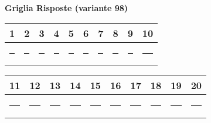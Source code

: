 \documentclass{exam}%
\newcounter{variant}%
\begin{document}
%
\normalsize%
\setcounter{variant}{98}%
\noindent \textbf{  }%
\bigskip%
\noindent\textbf{Griglia Risposte (variante 98)}%
\begin{center}
\begin{tabular}{|c|c|c|c|c|c|c|c|c|c|}
\hline
1 & 2 & 3 & 4 & 5 & 6 & 7 & 8 & 9 & 10 \\ \hline
\rule{1cm}{0pt}\rule[-0.5em]{0pt}{1.5em} & \rule{1cm}{0pt}\rule[-0.5em]{0pt}{1.5em} & \rule{1cm}{0pt}\rule[-0.5em]{0pt}{1.5em} & \rule{1cm}{0pt}\rule[-0.5em]{0pt}{1.5em} & \rule{1cm}{0pt}\rule[-0.5em]{0pt}{1.5em} & \rule{1cm}{0pt}\rule[-0.5em]{0pt}{1.5em} & \rule{1cm}{0pt}\rule[-0.5em]{0pt}{1.5em} & \rule{1cm}{0pt}\rule[-0.5em]{0pt}{1.5em} & \rule{1cm}{0pt}\rule[-0.5em]{0pt}{1.5em} & \rule{1cm}{0pt}\rule[-0.5em]{0pt}{1.5em} \\ \hline
\end{tabular}
\end{center}%
\vspace{0.3em}%
\begin{center}
\begin{tabular}{|c|c|c|c|c|c|c|c|c|c|}
\hline
11 & 12 & 13 & 14 & 15 & 16 & 17 & 18 & 19 & 20 \\ \hline
\rule{1cm}{0pt}\rule[-0.5em]{0pt}{1.5em} & \rule{1cm}{0pt}\rule[-0.5em]{0pt}{1.5em} & \rule{1cm}{0pt}\rule[-0.5em]{0pt}{1.5em} & \rule{1cm}{0pt}\rule[-0.5em]{0pt}{1.5em} & \rule{1cm}{0pt}\rule[-0.5em]{0pt}{1.5em} & \rule{1cm}{0pt}\rule[-0.5em]{0pt}{1.5em} & \rule{1cm}{0pt}\rule[-0.5em]{0pt}{1.5em} & \rule{1cm}{0pt}\rule[-0.5em]{0pt}{1.5em} & \rule{1cm}{0pt}\rule[-0.5em]{0pt}{1.5em} & \rule{1cm}{0pt}\rule[-0.5em]{0pt}{1.5em} \\ \hline
\end{tabular}
\end{center}%
\vspace{1em}%
\end{document}
